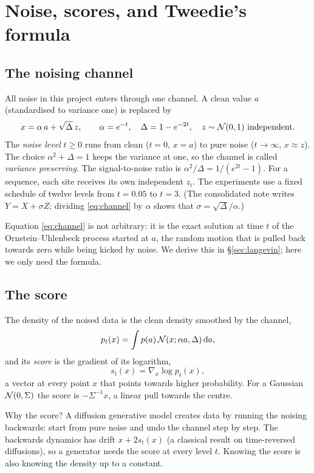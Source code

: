 \section{Noise, scores, and Tweedie's formula}\label{sec:noise}

\subsection{The noising channel}

All noise in this project enters through one channel. A clean value $a$ (standardised to variance one) is
replaced by
\begin{equation}\label{eq:channel}
  x=\alpha\,a+\sqrt{\Delta}\,z,\qquad \alpha=e^{-t},\quad \Delta=1-e^{-2t},\quad z\sim\mathcal{N}(0,1)\ \text{independent}.
\end{equation}
The \emph{noise level} $t\ge0$ runs from clean ($t=0$, $x=a$) to pure noise ($t\to\infty$, $x\approx z$). The
choice $\alpha^2+\Delta=1$ keeps the variance at one, so the channel is called \emph{variance preserving}. The
signal-to-noise ratio is $\alpha^2/\Delta=1/(e^{2t}-1)$. For a sequence, each site receives its own independent
$z_i$. The experiments use a fixed schedule of twelve levels from $t=0.05$ to $t=3$. (The consolidated note
writes $Y=X+\sigma Z$; dividing \eqref{eq:channel} by $\alpha$ shows that $\sigma=\sqrt\Delta/\alpha$.)

Equation \eqref{eq:channel} is not arbitrary: it is the exact solution at time $t$ of the Ornstein--Uhlenbeck
process started at $a$, the random motion that is pulled back towards zero while being kicked by noise. We
derive this in \S\ref{sec:langevin}; here we only need the formula.

\subsection{The score}

The density of the noised data is the clean density smoothed by the channel,
\[
  p_t(x)=\int p(a)\,\mathcal{N}(x;\alpha a,\Delta)\,\mathrm{d} a,
\]
and its \emph{score} is the gradient of its logarithm,
\[
  s_t(x)=\nabla_x\log p_t(x),
\]
a vector at every point $x$ that points towards higher probability. For a Gaussian $\mathcal{N}(0,\Sigma)$ the score
is $-\Sigma^{-1}x$, a linear pull towards the centre.

Why the score? A diffusion generative model creates data by running the noising backwards: start from
pure noise and undo the channel step by step. The backwards dynamics has drift $x+2s_t(x)$ (a classical
result on time-reversed diffusions), so a generator needs the score at every level $t$. Knowing the score
is also knowing the density up to a constant.

